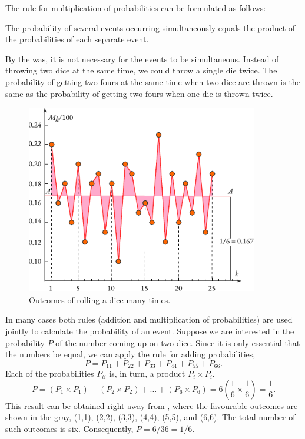 The rule for multiplication of probabilities can be formulated as
follows:
\begin{mybox}{}
The probability of several events occurring simultaneously equals the product of the probabilities of each separate event.
\end{mybox}
By the was, it is not necessary for the events to be simultaneous. Instead of throwing two dice at the same time, we could throw a
 single die twice. The probability of getting two fours at the same
 time when two dice are thrown is the same as the probability of
 getting two fours when one die is thrown twice.

 \begin{figure}[t]
 \centering
 \includegraphics[width=0.9\textwidth]{figures/die-graph.pdf}
\caption{Outcomes of rolling a dice many times.\label{die-graph}}
 \end{figure}
 
 
In many cases both rules (addition and multiplication of
probabilities) are used jointly to calculate the probability of an
event. Suppose we are interested in the probability $P$ of the  number coming up on two dice. Since it is only essential that the numbers be equal, we can apply the rule for adding probabilities,
\begin{equation*}
P = P_{11} + P_{22} + P_{33} + P_{44} + P_{55} + P_{66}.
\end{equation*}
Each of the probabilities $P_{ii}$ is, in turn, a product $P_{i} \times P_{i}$. 
\begin{equation*}
P = (P_{1} \times P_{1}) + (P_{2} \times P_{2}) + \ldots + (P_{6}
\times P_{6}) = 6 \left( \dfrac{1}{6} \times \dfrac{1}{6} \right) = \dfrac{1}{6}.
\end{equation*}
This result can be obtained right away from , where
the favourable outcomes are shown in the gray, (1,1), (2,2), (3,3),
(4,4), (5,5), and (6,6). The total number of such outcomes is six. Consequently, $P = 6/36 = 1/6$.

